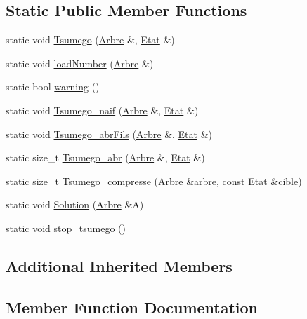 \subsection*{Static Public Member Functions}
\begin{DoxyCompactItemize}
\item 
static void \hyperlink{class_i_a_a364aef554d81e9a93bff08c28d437497}{Tsumego} (\hyperlink{class_arbre}{Arbre} \&, \hyperlink{class_etat}{Etat} \&)
\item 
static void \hyperlink{class_i_a_a5c0a6371478dedeb16372d13ce13cc34}{load\+Number} (\hyperlink{class_arbre}{Arbre} \&)
\item 
static bool \hyperlink{class_i_a_a7099f0c1f9a2c0c598975ac0ff6a32bc}{warning} ()
\item 
static void \hyperlink{class_i_a_a42202360406fe67babfd01a9b7902fd2}{Tsumego\+\_\+naif} (\hyperlink{class_arbre}{Arbre} \&, \hyperlink{class_etat}{Etat} \&)
\item 
static void \hyperlink{class_i_a_a6f616b7d3d9d39eef4780b7a03226260}{Tsumego\+\_\+abr\+Fils} (\hyperlink{class_arbre}{Arbre} \&, \hyperlink{class_etat}{Etat} \&)
\item 
static size\+\_\+t \hyperlink{class_i_a_af1f6e5abe41a2225b17ca319c1fc0e4e}{Tsumego\+\_\+abr} (\hyperlink{class_arbre}{Arbre} \&, \hyperlink{class_etat}{Etat} \&)
\item 
static size\+\_\+t \hyperlink{class_i_a_a5d86a3548f2410f7fc0676b89d07f4fd}{Tsumego\+\_\+compresse} (\hyperlink{class_arbre}{Arbre} \&arbre, const \hyperlink{class_etat}{Etat} \&cible)
\item 
static void \hyperlink{class_i_a_a8113a453920dfbee224ae38a6367e059}{Solution} (\hyperlink{class_arbre}{Arbre} \&A)
\item 
static void \hyperlink{class_i_a_a61a236c15bade2bb202d2f6e25825894}{stop\+\_\+tsumego} ()
\end{DoxyCompactItemize}
\subsection*{Additional Inherited Members}


\subsection{Member Function Documentation}
\mbox{\label{class_i_a_a5c0a6371478dedeb16372d13ce13cc34}} 
